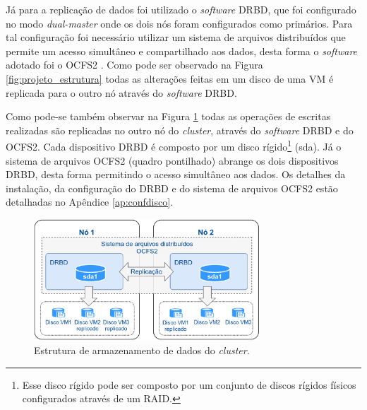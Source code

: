 \newpage
Já para a replicação de dados foi utilizado o \textit{software} \ac{DRBD}, que foi configurado no modo \textit{dual-master} onde os dois nós 
foram configurados como primários. Para tal configuração foi necessário utilizar um sistema de arquivos distribuídos que permite um acesso 
simultâneo e compartilhado aos dados, desta forma o \textit{software} adotado foi o \ac{OCFS2} \cite{ocfs2}. 
Como pode ser observado na Figura \ref{fig:projeto_estrutura} todas as alterações feitas em um disco de uma \ac{VM} é replicada para o 
outro nó através do \textit{software} \ac{DRBD}. 

Como pode-se também observar na Figura \ref{fig:projeto_discos} todas as operações de escritas realizadas são replicadas no outro nó do
\textit{cluster}, através do \textit{software} \ac{DRBD} e do \ac{OCFS2}. Cada dispositivo \ac{DRBD} é composto por um disco 
rígido\footnote[1]{Esse disco rígido pode ser composto por um conjunto de discos rígidos físicos configurados através de um \ac{RAID}.} 
(sda). Já o sistema de arquivos \ac{OCFS2} (quadro pontilhado) abrange os dois dispositivos \ac{DRBD}, desta forma permitindo o acesso simultâneo aos dados. 
Os detalhes da instalação, da configuração do \ac{DRBD} e do sistema de arquivos \ac{OCFS2} estão detalhadas no Apêndice \ref{ap:confdisco}. 

\begin{figure}[h!]
 \centering
 \includegraphics[width=320px]{img/projeto_discos.eps}
 \caption{Estrutura de armazenamento de dados do \textit{cluster}.}
 \label{fig:projeto_discos}
\end{figure}

